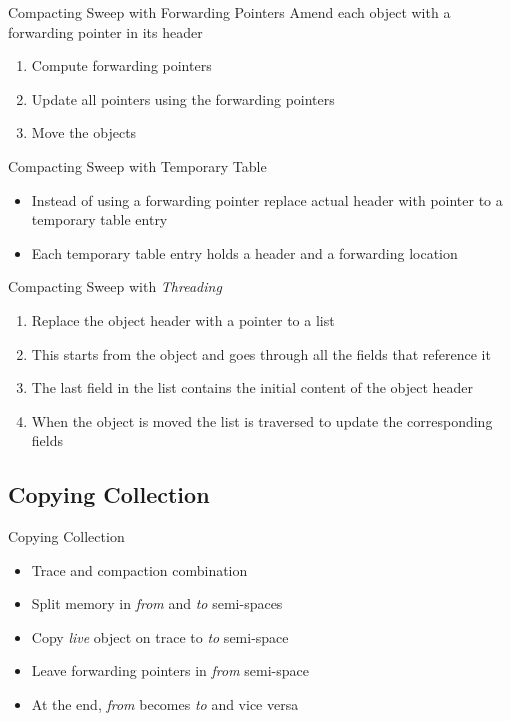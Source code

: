 \documentclass[
14pt,
aspectratio=169,
usenames,
dvipsnames,
x11names]{beamer}
\begin{document}
\begin{frame}{Compacting Sweep with Forwarding Pointers}
  \alert{Amend} each object with a forwarding pointer in its header\\

  \begin{enumerate}  \setlength{\itemsep}{\fill}
  \item \alert{Compute} forwarding pointers
  \item \alert{Update} all pointers using the forwarding pointers
  \item \alert{Move} the objects
  \end{enumerate}
\end{frame}

\begin{frame}{Compacting Sweep with Temporary Table}
  \begin{itemize}  \setlength{\itemsep}{\fill}
  \item Instead of using a forwarding pointer \alert{replace actual header with pointer to a temporary table entry}
  \item Each temporary table entry holds \alert{a header and a forwarding location}
  \end{itemize}
\end{frame}

\begin{frame}{Compacting Sweep with \textit{Threading}}
  \begin{enumerate}  \setlength{\itemsep}{\fill}
  \item Replace the object header with a pointer to a list
  \item This starts from the object and goes through all the fields that reference it
  \item The last field in the list contains the initial content of the object header
  \item When the object is moved the list is traversed to update the corresponding fields
  \end{enumerate}
\end{frame}

\subsection{Copying Collection}

\begin{frame}{Copying Collection}
  \begin{itemize}  \setlength{\itemsep}{\fill}
  \item \alert{Trace and compaction} combination
  \item \alert{Split memory} in \textit{from} and \textit{to} semi-spaces
  \item \alert{Copy} \textit{live} object on trace to \textit{to} semi-space
  \item \alert{Leave} forwarding pointers in \textit{from} semi-space
  \item At the end, \textit{from} becomes \textit{to} and vice versa
  \end{itemize}
\end{frame}
\end{document}
